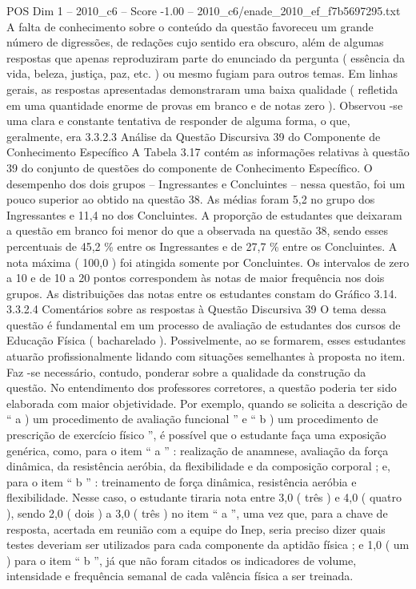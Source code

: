 \begin{textsample}{POS Dim 1 – 2010\_c6 – Score -1.00 – 2010\_c6/enade\_2010\_ef\_f7b5697295.txt}
A falta de conhecimento sobre o conteúdo da questão favoreceu um grande número de digressões, de redações cujo sentido era obscuro, além de algumas respostas que apenas reproduziram parte do enunciado da pergunta ( essência da vida, beleza, justiça, paz, etc. ) ou mesmo fugiam para outros temas.
Em linhas gerais, as respostas apresentadas demonstraram uma baixa qualidade ( refletida em uma quantidade enorme de provas em branco e de notas zero ).
Observou -se uma clara e constante tentativa de responder de alguma forma, o que, geralmente, era 3.3.2.3 Análise da Questão Discursiva 39 do Componente de Conhecimento Específico A Tabela 3.17 contém as informações relativas à questão 39 do conjunto de questões do componente de Conhecimento Específico.
O desempenho dos dois grupos – Ingressantes e Concluintes – nessa questão, foi um pouco superior ao obtido na questão 38.
As médias foram 5,2 no grupo dos Ingressantes e 11,4 no dos Concluintes.
A proporção de estudantes que deixaram a questão em branco foi menor do que a observada na questão 38, sendo esses percentuais de 45,2 \% entre os Ingressantes e de 27,7 \% entre os Concluintes.
A nota máxima ( 100,0 ) foi atingida somente por Concluintes.
Os intervalos de zero a 10 e de 10 a 20 pontos correspondem às notas de maior frequência nos dois grupos.
As distribuições das notas entre os estudantes constam do Gráfico 3.14. 3.3.2.4 Comentários sobre as respostas à Questão Discursiva 39 O tema dessa questão é fundamental em um processo de avaliação de estudantes dos cursos de Educação Física ( bacharelado ).
Possivelmente, ao se formarem, esses estudantes atuarão profissionalmente lidando com situações semelhantes à proposta no item.
Faz -se necessário, contudo, ponderar sobre a qualidade da construção da questão.
No entendimento dos professores corretores, a questão poderia ter sido elaborada com maior objetividade.
Por exemplo, quando se solicita a descrição de “ a ) um procedimento de avaliação funcional ” e “ b ) um procedimento de prescrição de exercício físico ”, é possível que o estudante faça uma exposição genérica, como, para o item “ a ” : realização de anamnese, avaliação da força dinâmica, da resistência aeróbia, da flexibilidade e da composição corporal ; e, para o item “ b ” : treinamento de força dinâmica, resistência aeróbia e flexibilidade.
Nesse caso, o estudante tiraria nota entre 3,0 ( três ) e 4,0 ( quatro ), sendo 2,0 ( dois ) a 3,0 ( três ) no item “ a ”, uma vez que, para a chave de resposta, acertada em reunião com a equipe do Inep, seria preciso dizer quais testes deveriam ser utilizados para cada componente da aptidão física ; e 1,0 ( um ) para o item “ b ”, já que não foram citados os indicadores de volume, intensidade e frequência semanal de cada valência física a ser treinada.

\end{textsample}
